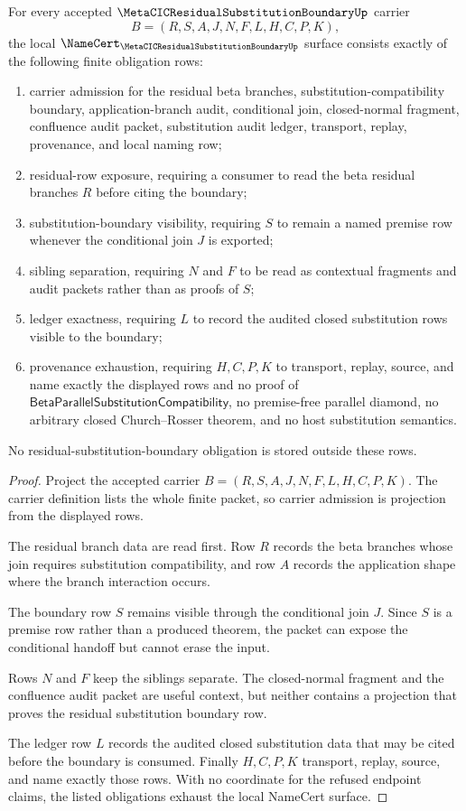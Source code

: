 \begin{theorem}
\label{thm:metacic-residual-substitution-boundary-namecert-obligations}
For every accepted $\MetaCICResidualSubstitutionBoundaryUp$ carrier
$$
B=(R,S,A,J,N,F,L,H,C,P,K),
$$
the local $\NameCert_{\MetaCICResidualSubstitutionBoundaryUp}$ surface consists exactly of the following finite obligation rows:
\begin{enumerate}
\item carrier admission for the residual beta branches, substitution-compatibility boundary, application-branch audit, conditional join, closed-normal fragment, confluence audit packet, substitution audit ledger, transport, replay, provenance, and local naming row;
\item residual-row exposure, requiring a consumer to read the beta residual branches $R$ before citing the boundary;
\item substitution-boundary visibility, requiring $S$ to remain a named premise row whenever the conditional join $J$ is exported;
\item sibling separation, requiring $N$ and $F$ to be read as contextual fragments and audit packets rather than as proofs of $S$;
\item ledger exactness, requiring $L$ to record the audited closed substitution rows visible to the boundary;
\item provenance exhaustion, requiring $H,C,P,K$ to transport, replay, source, and name exactly the displayed rows and no proof of $\mathsf{BetaParallelSubstitutionCompatibility}$, no premise-free parallel diamond, no arbitrary closed Church--Rosser theorem, and no host substitution semantics.
\end{enumerate}
No residual-substitution-boundary obligation is stored outside these rows.
\end{theorem}
\begin{proof}
Project the accepted carrier $B=(R,S,A,J,N,F,L,H,C,P,K)$. The carrier definition lists the whole finite packet, so carrier admission is projection from the displayed rows.

The residual branch data are read first. Row $R$ records the beta branches whose join requires substitution compatibility, and row $A$ records the application shape where the branch interaction occurs.

The boundary row $S$ remains visible through the conditional join $J$. Since $S$ is a premise row rather than a produced theorem, the packet can expose the conditional handoff but cannot erase the input.

Rows $N$ and $F$ keep the siblings separate. The closed-normal fragment and the confluence audit packet are useful context, but neither contains a projection that proves the residual substitution boundary row.

The ledger row $L$ records the audited closed substitution data that may be cited before the boundary is consumed. Finally $H,C,P,K$ transport, replay, source, and name exactly those rows. With no coordinate for the refused endpoint claims, the listed obligations exhaust the local NameCert surface.
\end{proof}


